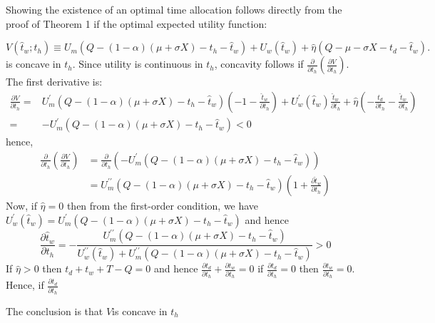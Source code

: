 \documentclass[12pt,a4paper,british]{article}
\theoremstyle{definition}
\theoremstyle{plain}
\theoremstyle{plain}
\theoremstyle{plain}
\begin{document}
Showing the existence of an optimal time allocation follows directly from the proof of Theorem 1 if the optimal expected utility function:

\begin{equation*}
V\left(\hat{t}_{w};t_{h}\right)\equiv U_{m}\left(Q-\left(1-\alpha\right)\left(\mu+\sigma X\right)-t_{h}-\hat{t}_{w}\right)+U_{w}\left(\hat{t}_{w}\right)+\hat{\eta}\left(Q-\mu-\sigma X-t_{d}-\hat{t}_{w}\right).
\end{equation*}%
is concave in $t_{h}$. Since utility is continuous in $t_{h}$, concavity follows if $\frac{\partial}{\partial t_{h}}\left(\frac{\partial V}{\partial t_{h}}\right)$. The first derivative is:
\begin{align*}
\frac{\partial V}{\partial t_{h}}= & U_{m}^{\prime}\left(Q-\left(1-\alpha\right)\left(\mu+\sigma X\right)-t_{h}-\hat{t}_{w}\right)\left(-1-\frac{\hat{t}_{w}}{\partial t_{h}}\right)+U_{w}^{\prime}\left(\hat{t}_{w}\right)\frac{\hat{t}_{w}}{\partial t_{h}}+\hat{\eta}\left(-\frac{t_{d}}{\partial t_{h}}-\frac{\hat{t}_{w}}{\partial t_{h}}\right)\\
= & -U_{m}^{\prime}\left(Q-\left(1-\alpha\right)\left(\mu+\sigma X\right)-t_{h}-\hat{t}_{w}\right)<0
\end{align*}
hence,
\begin{align*}
\frac{\partial}{\partial t_{h}}\left(\frac{\partial V}{\partial t_{h}}\right) & =\frac{\partial}{\partial t_{h}}\left(-U_{m}^{\prime}\left(Q-\left(1-\alpha\right)\left(\mu+\sigma X\right)-t_{h}-\hat{t}_{w}\right)\right)\\
 & =U_{m}^{\prime\prime}\left(Q-\left(1-\alpha\right)\left(\mu+\sigma X\right)-t_{h}-\hat{t}_{w}\right)\left(1+\frac{\partial\hat{t}_{w}}{\partial t_{h}}\right)
\end{align*}
Now, if $\hat{\eta}=0$ then from the first-order condition, we have $U_{w}^{\prime}\left(\hat{t}_{w}\right)=U_{m}^{\prime}\left(Q-\left(1-\alpha\right)\left(\mu+\sigma X\right)-t_{h}-\hat{t}_{w}\right)$ and hence
\begin{equation*}
\frac{\partial\hat{t}_{w}}{\partial t_{h}}=-\frac{U_{m}^{\prime\prime}\left(Q-\left(1-\alpha\right)\left(\mu+\sigma X\right)-t_{h}-\hat{t}_{w}\right)}{U_{w}^{\prime\prime}\left(\hat{t}_{w}\right)+U_{m}^{\prime\prime}\left(Q-\left(1-\alpha\right)\left(\mu+\sigma X\right)-t_{h}-\hat{t}_{w}\right)}>0
\end{equation*}
If $\hat{\eta}>0$ then $t_{d}+t_{w}+T-Q=0$ and hence $\frac{\partial t_{d}}{\partial t_{h}}+\frac{\partial t_{w}}{\partial t_{h}}=0$ if $\frac{\partial t_{d}}{\partial t_{h}}=0$ then $\frac{\partial t_{w}}{\partial t_{h}}=0$. Hence, if $\frac{\partial t_{d}}{\partial t_{h}}$

The conclusion is that $V$is concave in $t_{h}$
\end{document}
